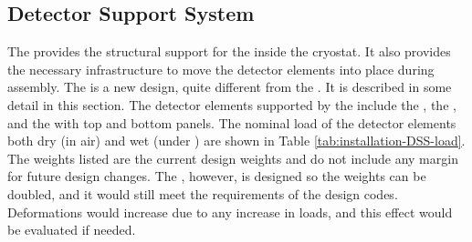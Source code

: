 \subsection{Detector Support System}
\label{sec:fdsp-tc-infr-dss}

The  provides the structural support for the  inside the cryostat.  
It also provides the necessary infrastructure to move the detector elements into place during
assembly. 
The  is a new design, quite different from the  . It is described in some detail in this
section. 
The detector elements supported by the  include the , the , and the  with top and bottom  panels. The nominal load of the detector elements both dry (in air) and wet (under ) are shown in Table \ref{tab:installation-DSS-load}. The weights listed are the current design weights and do not include any margin for future design changes.  
The , however, is designed so the weights can be doubled, and it would still meet the requirements of the design codes.  
Deformations would increase due to any increase in loads, and this effect would be evaluated if needed.
